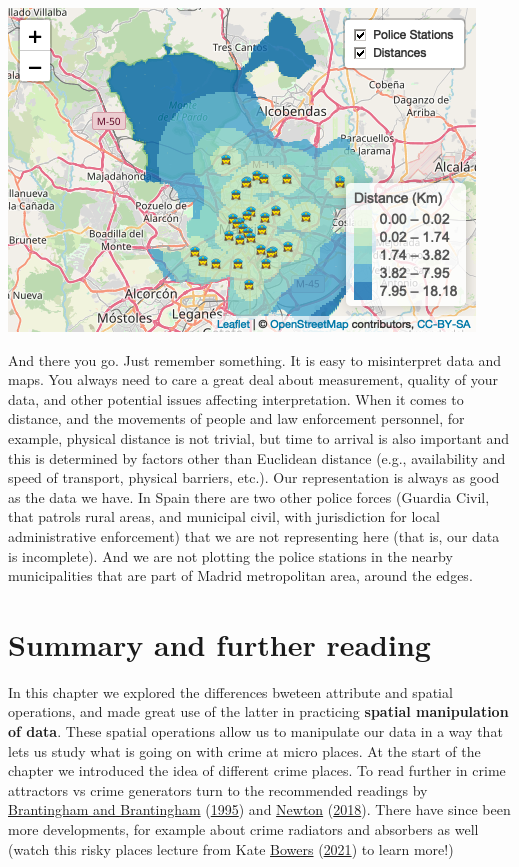 \documentclass[
]{book}
\begin{document}
\includegraphics{crime_mapping_files/figure-latex/unnamed-chunk-74-1.png}

And there you go. Just remember something. It is easy to misinterpret data and maps. You always need to care a great deal about measurement, quality of your data, and other potential issues affecting interpretation. When it comes to distance, and the movements of people and law enforcement personnel, for example, physical distance is not trivial, but time to arrival is also important and this is determined by factors other than Euclidean distance (e.g., availability and speed of transport, physical barriers, etc.). Our representation is always as good as the data we have. In Spain there are two other police forces (Guardia Civil, that patrols rural areas, and municipal civil, with jurisdiction for local administrative enforcement) that we are not representing here (that is, our data is incomplete). And we are not plotting the police stations in the nearby municipalities that are part of Madrid metropolitan area, around the edges.

\hypertarget{summary-and-further-reading-1}{%
\section{Summary and further reading}\label{summary-and-further-reading-1}}

In this chapter we explored the differences bweteen attribute and spatial operations, and made great use of the latter in practicing \textbf{spatial manipulation of data}. These spatial operations allow us to manipulate our data in a way that lets us study what is going on with crime at micro places. At the start of the chapter we introduced the idea of different crime places. To read further in crime attractors vs crime generators turn to the recommended readings by \protect\hyperlink{ref-Brantingham_1995}{Brantingham and Brantingham} (\protect\hyperlink{ref-Brantingham_1995}{1995}) and \protect\hyperlink{ref-Newton_2018}{Newton} (\protect\hyperlink{ref-Newton_2018}{2018}). There have since been more developments, for example about crime radiators and absorbers as well (watch this risky places lecture from Kate \protect\hyperlink{ref-Bowers_2021}{Bowers} (\protect\hyperlink{ref-Bowers_2021}{2021}) to learn more!)
\end{document}
